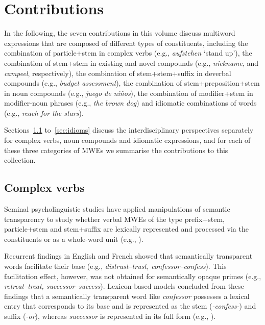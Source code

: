 \documentclass[output=paper]{langsci/langscibook}
\begin{document}
\section{Contributions}

In the following, the seven contributions in this volume discuss multiword expressions that are composed of different types of constituents, including the
combination of particle+stem in complex verbs (e.g., \textit{aufstehen} `stand up’), the combination of stem+stem in existing and novel compounds (e.g., \textit{nickname}, and \textit{campeel}, respectively), the combination of stem+stem+suffix in deverbal compounds (e.g., \textit{budget assessment}), the combination of stem+preposition+stem in noun compounds (e.g., \textit{juego de niños}), the combination of modifier+stem in mod\-i\-fi\-er-noun phrases (e.g., \textit{the brown dog}) and idiomatic combinations of words (e.g., \textit{reach for the stars}).

Sections~\ref{sec:verbs} to~\ref{sec:idioms} discuss the
interdisciplinary perspectives separately for complex verbs, noun
compounds and idiomatic expressions, and for each of these three
categories of MWEs we summarise the contributions to this collection.


\subsection{Complex verbs}
\label{sec:verbs}

Seminal psycholinguistic studies have applied manipulations of
semantic transparency to study whether verbal MWEs of the type
prefix+stem, particle+stem and stem+suffix are lexically represented
and processed via the constituents or as a whole-word unit (e.g.,
\citealt{Taft/Forster:75, MarslenWilsonEtAl:94, LongtinEtAl:03}).

Recurrent findings in English and French showed that semantically
transparent words facilitate their base (e.g.,
\textit{distrust--trust, confessor--confess}). This facilitation
effect, however, was not obtained for semantically opaque primes
(e.g., \textit{retreat--treat, successor--success}). Lexicon-based
models concluded from these\linebreak
findings that a semantically transparent
word like \textit{confessor} possesses a lexical entry that
corresponds to its base and is represented as the stem
(\textit{-confess-}) and suffix (\textit{-or}), whereas
\textit{successor} is represented in its full form (e.g.,
\citealt{RastleEtAl:00, FeldmanEtAl:04, DiependaeleEtAl:05, DiependaeleEtAl:09,
  Meunier/Longtin:07, MarslenWilsonEtAl:08, Taft/NguyenHoan:10}).
\end{document}
